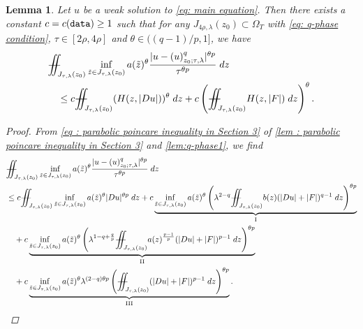 \documentclass[11pt,oneside, english,reqno,twoside a4paper]{amsart}
\newtheorem{lemma}{Lemma}[section]
\theoremstyle{definition}
\numberwithin{theorem}{section}
\numberwithin{equation}{section}
\newcommand{\iintss}{{\int\hspace{-0.28cm}\int}}
\newcommand{ \miints }{{\iintss\hspace{-0.56cm} -\hspace{-0.15cm}-}}
\newcommand{\miint}[1]{{\miints_{\hspace{-0.13cm}#1}}}
\begin{document}
\begin{lemma} \label{lem: q-term of parabolic poincare inequality on q-intrinsic cylinders_2}
Let $u$ be a weak solution to \eqref{eq: main equation}. Then there exists a constant $c=c(\textnormal{\texttt{data}}) \geq 1$ such that for any $J_{4\rho,\lambda}(z_0)\subset \Omega_T$ with \eqref{eq: q-phase condition}, $\tau \in [2\rho,4\rho]$ and $\theta \in ((q-1)/p,1]$, we have
\begin{align*}
&\miint{J_{\tau,\lambda}(z_0)} \inf_{\tilde{z}\in J_{\tau,\lambda}(z_0)}a(\tilde{z})^\theta\frac{|u-(u)^q_{z_0;\tau,\lambda}|^{\theta p}}{\tau^{\theta p}}\; dz\\
&\quad \leq c \miint{J_{\tau,\lambda}(z_0)}(H(z,|Du|))^{\theta}\; dz +c\left(\miint{J_{\tau,\lambda}(z_0)}H(z,|F|)\; d z\right)^{\theta}.
\end{align*}
\begin{proof}
 From \cref{eq : parabolic poincare inequality in Section 3} of \cref{lem : parabolic poincare inequality in Section 3} and \cref{lem:q-phase1}, we find
\begin{align*}
&\miint{J_{\tau,\lambda}(z_0)}\inf_{\tilde{z}\in J_{\tau, \lambda}(z_0)}a(\tilde{z})^{\theta}\frac{|u-(u)^q_{z_0;\tau,\lambda}|^{\theta p}}{\tau^{\theta p}}\; dz\\
&\leq c\miint{J_{\tau,\lambda}(z_0)} \inf_{\tilde{z}\in J_{\tau, \lambda}(z_0)}a(\tilde{z})^{\theta}|Du|^{\theta p} \; dz + c\underbrace{\inf_{\tilde{z}\in J_{\tau, \lambda}(z_0)}a(\tilde{z})^{\theta}\left(\lambda^{2-q}\miint{J_{\tau,\lambda}(z_0)}b(z) (|Du|+|F|)^{q-1}\;dz \right)^{\theta p}}_{\mathrm{I}}\\
&\quad + c\underbrace{\inf_{\tilde{z}\in J_{\tau, \lambda}(z_0)}a(\tilde{z})^{\theta}\left(\lambda^{1-q+\frac{q}{p}}\miint{J_{\tau,\lambda}(z_0)} a(z)^{\frac{p-1}{p}}(|Du|+|F|)^{p-1}\; dz \right)^{\theta p}}_{\mathrm{II}}\\
&\quad + c\underbrace{\inf_{\tilde{z}\in J_{\tau, \lambda}(z_0)}a(\tilde{z})^{\theta}\lambda^{(2-q)\theta p}\left(\miint{J_{\tau,\lambda}(z_0)} (|Du|+|F|)^{p-1}\; dz \right)^{\theta p}}_{\mathrm{III}}.
\end{align*} 


\end{proof}
\end{lemma}
\end{document}
